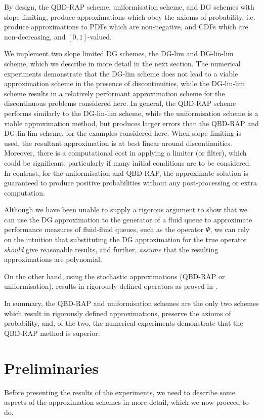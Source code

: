 By design, the QBD-RAP scheme, uniformisation scheme, and DG schemes with slope limiting, produce approximations which obey the axioms of probability, i.e. produce approximations to PDFs which are non-negative, and CDFs which are non-decreasing, and \([0,1]\)-valued.  

We implement two slope limited DG schemes, the DG-lim and DG-lin-lim scheme, which we describe in more detail in the next section. The numerical experiments demonstrate that the DG-lim scheme does not lead to a viable approximation scheme in the presence of discontinuities, while the DG-lin-lim scheme results in a relatively performant approximation scheme for the discontinuous problems considered here. In general, the QBD-RAP scheme performs similarly to the DG-lin-lim scheme, while the uniformisation scheme is a viable approximation method, but produces larger errors than the QBD-RAP and DG-lin-lim scheme, for the examples considered here. When slope limiting is used, the resultant approximation is at best linear around discontinuities. Moreover, there is a computational cost in applying a limiter (or filter), which could be significant, particularly if many initial conditions are to be considered. In contrast, for the uniformisation and QBD-RAP, the approximate solution is guaranteed to produce positive probabilities without any post-processing or extra computation. 

Although we have been unable to supply a rigorous argument to show that we can use the DG approximation to the generator of a fluid queue to approximate performance measures of fluid-fluid queues, such as the operator \(\mathbb \Psi\), we can rely on the intuition that substituting the DG approximation for the true operator \emph{should} give reasonable results, and further, \emph{assume} that the resulting approximations are polynomial.

On the other hand, using the stochastic approximations (QBD-RAP or uniformisation), results in rigorously defined operators as proved in \cite{bgnp2021}.

In summary, the QBD-RAP and uniformisation schemes are the only two schemes which result in rigorously defined approximations, preserve the axioms of probability, and, of the two, the numerical experiments demonstrate that the QBD-RAP method is superior. 

\section{Preliminaries}
Before presenting the results of the experiments, we need to describe some aspects of the approximation schemes in more detail, which we now proceed to do. 

